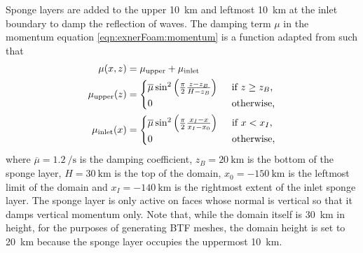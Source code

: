 Sponge layers are added to the upper \SI{10}{\kilo\meter} and leftmost \SI{10}{\kilo\meter} at the inlet boundary to damp the reflection of waves.
The damping term \(\mu\) in the momentum equation \eqref{eqn:exnerFoam:momentum} is a function adapted from \citet{melvin2010} such that
\begin{subequations}
\begin{align}
	\mu(x, z) &= \mu_\mathrm{upper} + \mu_\mathrm{inlet} \\
	\mu_\mathrm{upper}(z) &= \begin{cases}
		\overline{\mu} \sin^2 \left( \frac{\pi}{2} \frac{z - z_B}{H - z_B} \right) & \enskip \text{if $z \geq z_B$,} \\
		0 & \enskip \text{otherwise,} \\
	\end{cases} \\
	\mu_\mathrm{inlet}(x) &= \begin{cases}
		\overline{\mu} \sin^2 \left( \frac{\pi}{2} \frac{x_I - x}{x_I - x_0} \right) & \enskip \text{if $x < x_I$,} \\
		0 & \enskip \text{otherwise,}
	\end{cases}
\end{align}
\end{subequations}
where $\overline{\mu} = \SI{1.2}{\per\second}$ is the damping coefficient, $z_B = \SI{20}{\kilo\meter}$ is the bottom of the sponge layer, $H = \SI{30}{\kilo\meter}$ is the top of the domain, $x_0 = \SI{-150}{\kilo\meter}$ is the leftmost limit of the domain and $x_I = \SI{-140}{\kilo\meter}$ is the rightmost extent of the inlet sponge layer.
The sponge layer is only active on faces whose normal is vertical so that it damps vertical momentum only.
Note that, while the domain itself is \SI{30}{\kilo\meter} in height, for the purposes of generating BTF meshes, the domain height is set to \SI{20}{\kilo\meter} because the sponge layer occupies the uppermost \SI{10}{\kilo\meter}.

